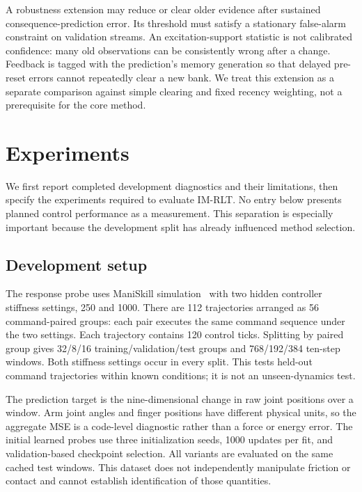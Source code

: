 \documentclass[10pt,letterpaper]{article}
\begin{document}
A robustness extension may reduce or clear older evidence after sustained consequence-prediction error. Its threshold must satisfy a stationary false-alarm constraint on validation streams. An excitation-support statistic is not calibrated confidence: many old observations can be consistently wrong after a change. Feedback is tagged with the prediction's memory generation so that delayed pre-reset errors cannot repeatedly clear a new bank. We treat this extension as a separate comparison against simple clearing and fixed recency weighting, not a prerequisite for the core method.

\section{Experiments}
\label{sec:experiments}
We first report completed development diagnostics and their limitations, then specify the experiments required to evaluate IM-RLT. No entry below presents planned control performance as a measurement. This separation is especially important because the development split has already influenced method selection.

\subsection{Development setup}
\label{sec:setup}
The response probe uses ManiSkill simulation~\citep{maniskill} with two hidden controller stiffness settings, 250 and 1000. There are 112 trajectories arranged as 56 command-paired groups: each pair executes the same command sequence under the two settings. Each trajectory contains 120 control ticks. Splitting by paired group gives 32/8/16 training/validation/test groups and 768/192/384 ten-step windows. Both stiffness settings occur in every split. This tests held-out command trajectories within known conditions; it is not an unseen-dynamics test.

The prediction target is the nine-dimensional change in raw joint positions over a window. Arm joint angles and finger positions have different physical units, so the aggregate MSE is a code-level diagnostic rather than a force or energy error. The initial learned probes use three initialization seeds, 1000 updates per fit, and validation-based checkpoint selection. All variants are evaluated on the same cached test windows. This dataset does not independently manipulate friction or contact and cannot establish identification of those quantities.
\end{document}

